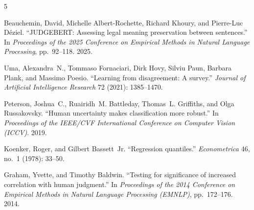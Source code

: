 
\begin{thebibliography}{5}
\providecommand{\natexlab}[1]{#1}

Beauchemin, David, Michelle Albert-Rochette, Richard Khoury, and Pierre-Luc
D{\'e}ziel. ``JUDGEBERT: Assessing legal meaning preservation between
sentences.'' In \emph{Proceedings of the 2025 Conference on Empirical Methods in
Natural Language Processing}, pp.~92--118. 2025.

Uma, Alexandra~N., Tommaso Fornaciari, Dirk Hovy, Silviu Paun, Barbara Plank,
and Massimo Poesio. ``Learning from disagreement: A survey.'' \emph{Journal of
Artificial Intelligence Research} 72 (2021): 1385--1470.

Peterson, Joshua~C., Ruairidh~M. Battleday, Thomas~L. Griffiths, and Olga
Russakovsky. ``Human uncertainty makes classification more robust.'' In
\emph{Proceedings of the IEEE/CVF International Conference on Computer Vision
(ICCV)}. 2019.

Koenker, Roger, and Gilbert Bassett~Jr. ``Regression quantiles.''
\emph{Econometrica} 46, no.~1 (1978): 33--50.

Graham, Yvette, and Timothy Baldwin. ``Testing for significance of increased
correlation with human judgment.'' In \emph{Proceedings of the 2014 Conference on
Empirical Methods in Natural Language Processing (EMNLP)}, pp.~172--176. 2014.

\end{thebibliography}
